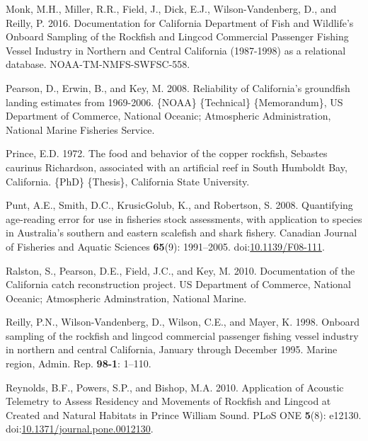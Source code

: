 \documentclass[11pt,
  english,
  letterpaper,
]{article}
\newlength{\cslhangindent}
\newenvironment{CSLReferences}[2] %
 {%
  \setlength{\parindent}{0pt}
  \ifodd #1 \everypar{\setlength{\hangindent}{\cslhangindent}}\ignorespaces\fi
  \ifnum #2 > 0
  \setlength{\parskip}{#2\baselineskip}
  \fi
 }%
 {}
\begin{document}
\begin{CSLReferences}{1}{0}
\leavevmode{}%
Monk, M.H., Miller, R.R., Field, J., Dick, E.J., Wilson-Vandenberg, D., and Reilly, P. 2016. Documentation for {California} {Department} of {Fish} and {Wildlife}'s {Onboard} {Sampling} of the {Rockfish} and {Lingcod} {Commercial} {Passenger} {Fishing} {Vessel} {Industry} in {Northern} and {Central} {California} (1987-1998) as a relational database. NOAA-TM-NMFS-SWFSC-558.

\leavevmode{}%
Pearson, D., Erwin, B., and Key, M. 2008. Reliability of {California}'s groundfish landing estimates from 1969-2006. \{NOAA\} \{Technical\} \{Memorandum\}, US Department of Commerce, National Oceanic; Atmospheric Administration, National Marine Fisheries Service.

\leavevmode{}%
Prince, E.D. 1972. The food and behavior of the copper rockfish, {Sebastes} caurinus {Richardson}, associated with an artificial reef in {South} {Humboldt} {Bay}, {California}. \{PhD\} \{Thesis\}, California State University.

\leavevmode{}%
Punt, A.E., Smith, D.C., KrusicGolub, K., and Robertson, S. 2008. Quantifying age-reading error for use in fisheries stock assessments, with application to species in {Australia}'s southern and eastern scalefish and shark fishery. Canadian Journal of Fisheries and Aquatic Sciences \textbf{65}(9): 1991--2005. doi:\href{https://doi.org/10.1139/F08-111}{10.1139/F08-111}.

\leavevmode{}%
Ralston, S., Pearson, D.E., Field, J.C., and Key, M. 2010. Documentation of the {California} catch reconstruction project. US Department of Commerce, National Oceanic; Atmospheric Adminstration, National Marine.

\leavevmode{}%
Reilly, P.N., Wilson-Vandenberg, D., Wilson, C.E., and Mayer, K. 1998. Onboard sampling of the rockfish and lingcod commercial passenger fishing vessel industry in northern and central {California}, {January} through {December} 1995. Marine region, Admin. Rep. \textbf{98-1}: 1--110.

\leavevmode{}%
Reynolds, B.F., Powers, S.P., and Bishop, M.A. 2010. Application of {Acoustic} {Telemetry} to {Assess} {Residency} and {Movements} of {Rockfish} and {Lingcod} at {Created} and {Natural} {Habitats} in {Prince} {William} {Sound}. PLoS ONE \textbf{5}(8): e12130. doi:\href{https://doi.org/10.1371/journal.pone.0012130}{10.1371/journal.pone.0012130}.


\end{CSLReferences}
\end{document}
